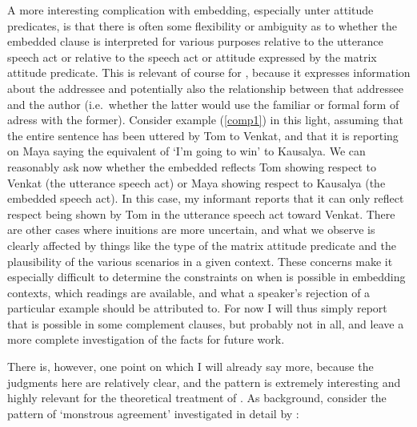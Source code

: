 \documentclass[output=paper, modfonts, nonflat]{langsci/langscibook}
\begin{document}
A more interesting complication with embedding, especially unter
attitude predicates, is that there is often some flexibility or
ambiguity as to whether the embedded clause is interpreted for various
purposes relative to the utterance speech act or relative to the
speech act or attitude expressed by the matrix attitude
predicate. This is relevant of course for \allagr, because it
expresses information about the addressee and potentially also the
relationship between that addressee and the author (i.e.\ whether the
latter would use the familiar or formal form of adress with the
former). Consider example (\ref{comp1}) in this light, assuming that
the entire sentence has been uttered by Tom to Venkat, and that it is
reporting on Maya saying the equivalent of `I'm going to win' to
Kausalya. We can reasonably ask now whether the embedded \allagr{}
reflects Tom showing respect to Venkat (the utterance speech act) or
Maya showing respect to Kausalya (the embedded speech act). In this
case, my informant reports that it can only reflect respect being
shown by Tom in the utterance speech act toward Venkat. There are
other cases where inuitions are more uncertain, and what we observe is
clearly affected by things like the type of the matrix attitude
predicate and the plausibility of the various scenarios in a given
context. These concerns make it especially difficult to determine the
constraints on when \allagr{} is possible in embedding contexts, which
readings are available, and what a speaker's rejection of a particular
example should be attributed to. For now I will thus simply report
that \allagr{} is possible in some complement clauses, but probably
not in all, and leave a more complete investigation of the facts for
future work.

\noindent There is, however, one point on which I will already say more, because
the judgments here are relatively clear, and the pattern is extremely
interesting and highly relevant for the theoretical treatment of
\allagr. As background, consider the pattern of `monstrous agreement'
investigated in detail by \citet{sundaresan:diss}:
\end{document}
